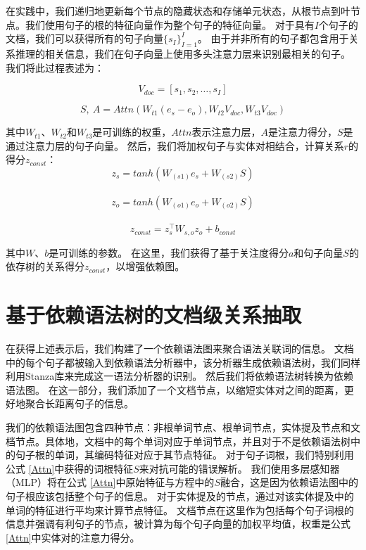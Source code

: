 \documentclass[bachelor]{thesis-uestc}
\begin{document}
在实践中，我们递归地更新每个节点的隐藏状态和存储单元状态，从根节点到叶节点。我们使用句子的根的特征向量作为整个句子的特征向量。
对于具有$I$个句子的文档，我们可以获得所有的句子向量$\{s_I\}_{I=1}^{I}$。
由于并非所有的句子都包含用于关系推理的相关信息，我们在句子向量上使用多头注意力层来识别最相关的句子。
我们将此过程表述为：

\begin{equation}
    V_{doc} = [s_1, s_2, \dots, s_I]
\end{equation}

\begin{equation}
    S,\  A = Attn(W_{t1}(e_s-e_o), W_{t2} V_{doc}, W_{t3} V_{doc})
    \label{Attn}
\end{equation}

其中$W_{t1}、W_{t2}$和$W_{t3}$是可训练的权重，$Attn$表示注意力层，$A$是注意力得分，$S$是通过注意力层的句子向量。
然后，我们将加权句子与实体对相结合，计算关系$r$的得分$z_{const}$：
\begin{equation}
    z_s = tanh(W_{(s1)}e_s+W_{(s2)}S)
\end{equation}
\\
\begin{equation}
    z_o = tanh(W_{(o1)}e_o+W_{(o2)}S)
\end{equation}
\\
\begin{equation}
    z_{const} = z_s^\top W_{s, o}z_o+b_{const}
\end{equation}

其中$W、b$是可训练的参数。
在这里，我们获得了基于关注度得分$a$和句子向量$S$的依存树的关系得分$z_{const}$，以增强依赖图。\par

\section{基于依赖语法树的文档级关系抽取}

在获得上述表示后，我们构建了一个依赖语法图来聚合语法关联词的信息。
文档中的每个句子都被输入到依赖语法分析器中，该分析器生成依赖语法树，我们同样利用Stanza库来完成这一语法分析器的识别。
然后我们将依赖语法树转换为依赖语法图。
在这一部分，我们添加了一个文档节点，以缩短实体对之间的距离，更好地聚合长距离句子的信息。\par

我们的依赖语法图包含四种节点：非根单词节点、根单词节点，实体提及节点和文档节点。具体地，文档中的每个单词对应于单词节点，并且对于不是依赖语法树中的句子根的单词，其编码特征对应于其节点特征。
对于句子词根，我们特别利用公式 \ref{Attn}中获得的词根特征$S$来对抗可能的错误解析。
我们使用多层感知器（MLP）将在公式 \ref{Attn}中原始特征与方程中的$S$融合，这是因为依赖语法图中的句子根应该包括整个句子的信息。
对于实体提及的节点，通过对该实体提及中的单词的特征进行平均来计算节点特征。
文档节点在这里作为包括每个句子词根的信息并强调有利句子的节点，被计算为每个句子向量的加权平均值，权重是公式 \ref{Attn}中实体对的注意力得分。\par
\end{document}
